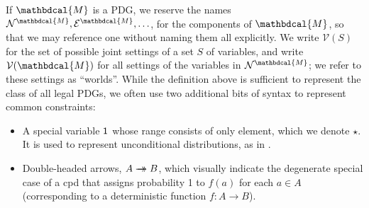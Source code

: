 \documentclass[letterpaper]{article} %
\theoremstyle{plain}
\theoremstyle{definition}
\theoremstyle{remark}
\newcommand{\vleftovers}[1]{{\color{vleftoverscolor} #1}}
\renewcommand{\vleftovers}[1]{} %
\newcommand{\tto}{\rightarrow\mathrel{\mspace{-15mu}}\rightarrow}
\newcommand{\V}{\mathcal V}
\newcommand{\N}{\mathcal N}
\newcommand{\Ed}{\mathcal E}
\newcommand{\dg}[1]{\mathbdcal{#1}}
\begin{document}
If $\dg M$ is a PDG, we reserve the names 
$\N^{\dg M}, \Ed^{\dg M}, \ldots$,
for the components of $\dg M$, so that we may reference one without naming them
all explicitly. We write $\V(S)$ for the set of possible joint settings of a set
$S$ of variables, and write
$\V(\dg M)$ for all settings of the variables in $\N^{\dg M}$; we
refer  to these settings as ``worlds''.
While the definition above is sufficient to represent the class of all legal
PDGs, we often use two additional bits of syntax to represent common
constraints:  
    	
\begin{itemize}
    \item A special variable $\sf 1$ whose range consists of only element, which
    we denote $\star$. It is used to represent unconditional distributions, as
    in .  
\vleftovers{
		\begin{example}\label{ex:worldsonly}
			A probability distribution $p$ over a measurable set $W$ of possible worlds is represented as 
			\begin{center}
				\scalebox{0.8}{
				\begin{tikzpicture}
					\node[dpadded] (1) at (0,0) {$\sf 1$};
					\node[dpadded] (W) at (3,0) {$W$};

					\draw[arr] (1) to node[fill=white]{$p$} (W);
				\end{tikzpicture}}
			\end{center}
		\end{example}
}%

		\item Double-headed arrows, $A \tto
                  B$, which visually indicate the degenerate special
                  case of a cpd that assigns probability 1 to $f(a)$
                  for each $a \in A$ (corresponding to a deterministic
                  function $f : A \to B$). 
\end{itemize}
\end{document}

